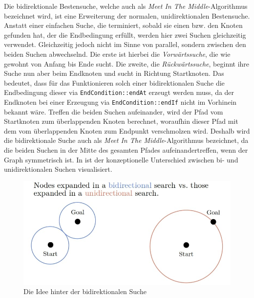             Die bidirektionale Bestensuche, welche auch als \emph{Meet In The Middle}-Algorithmus bezeichnet wird, ist eine Erweiterung der normalen, unidirektionalen Bestensuche. Anstatt einer einfachen Suche, die terminiert, sobald sie einen bzw. den Knoten gefunden hat, der die Endbedingung erfüllt, werden hier zwei Suchen gleichzeitig verwendet. Gleichzeitig jedoch nicht im Sinne von parallel, sondern zwischen den beiden Suchen abwechselnd. Die erste ist hierbei die \emph{Vorwärtssuche}, die wie gewohnt von Anfang bis Ende sucht. Die zweite, die \emph{Rückwärtssuche}, beginnt ihre Suche nun aber beim Endknoten und sucht in Richtung Startknoten. Das bedeutet, dass für das Funktionieren solch einer bidirektionalen Suche die Endbedingung dieser via \lstinline{EndCondition::endAt} erzeugt werden muss, da der Endknoten bei einer Erzeugung via \lstinline{EndCondition::endIf} nicht im Vorhinein bekannt wäre. Treffen die beiden Suchen aufeinander, wird der Pfad vom Startknoten zum überlappenden Knoten berechnet, woraufhin dieser Pfad mit dem vom überlappenden Knoten zum Endpunkt verschmolzen wird. Deshalb wird die bidirektionale Suche auch als \emph{Meet In The Middle}-Algorithmus bezeichnet, da die beiden Suchen in der Mitte des gesamten Pfades aufeinandertreffen, wenn der Graph symmetrisch ist. In  ist der konzeptionelle Unterschied zwischen bi- und unidirektionalen Suchen visualisiert.
            
            \begin{figure}
                \centering
                \includegraphics[width=0.6\linewidth]{images/bidi.png}
                \caption{Die Idee hinter der bidirektionalen Suche\\\cite{EZ:Web62}}
                \label{fig:bidi}
            \end{figure}
            
